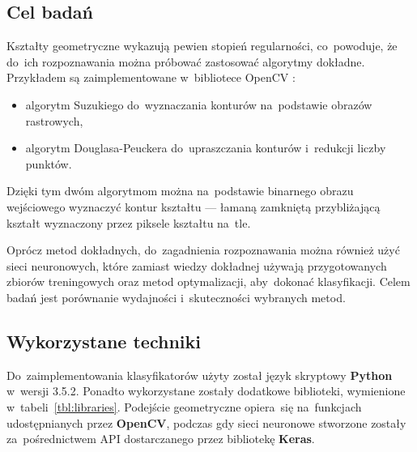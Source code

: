 \documentclass[11pt,a4paper]{article}
\begin{document}
\subsection{Cel badań}

Kształty geometryczne wykazują pewien stopień regularności, co~powoduje, że do~ich rozpoznawania można próbować zastosować algorytmy dokładne.
Przykładem są zaimplementowane w~bibliotece OpenCV \cite{opencv}:
\begin{itemize}
    \item algorytm Suzukiego \cite{suzuki1985} do~wyznaczania konturów na~podstawie obrazów rastrowych,
    \item algorytm Douglasa-Peuckera \cite{douglas1973} do~upraszczania konturów i~redukcji liczby punktów.
\end{itemize}
Dzięki tym dwóm algorytmom można na~podstawie binarnego obrazu wejściowego wyznaczyć kontur kształtu --- łamaną zamkniętą przybliżającą kształt wyznaczony przez piksele kształtu na~tle.

Oprócz metod dokładnych, do~zagadnienia rozpoznawania można również użyć sieci neuronowych, które zamiast wiedzy dokładnej używają przygotowanych zbiorów treningowych oraz metod optymalizacji, aby~dokonać klasyfikacji.
Celem badań jest porównanie wydajności i~skuteczności wybranych metod.

\subsection{Wykorzystane techniki}

Do~zaimplementowania klasyfikatorów użyty został język skryptowy \textbf{Python} w~wersji 3.5.2.
Ponadto wykorzystane zostały dodatkowe biblioteki, wymienione w~tabeli~\ref{tbl:libraries}.
Podejście geometryczne opiera~się na~funkcjach udostępnianych przez \textbf{OpenCV}, podczas gdy sieci neuronowe stworzone zostały za~pośrednictwem API dostarczanego przez bibliotekę \textbf{Keras}.
\end{document}
